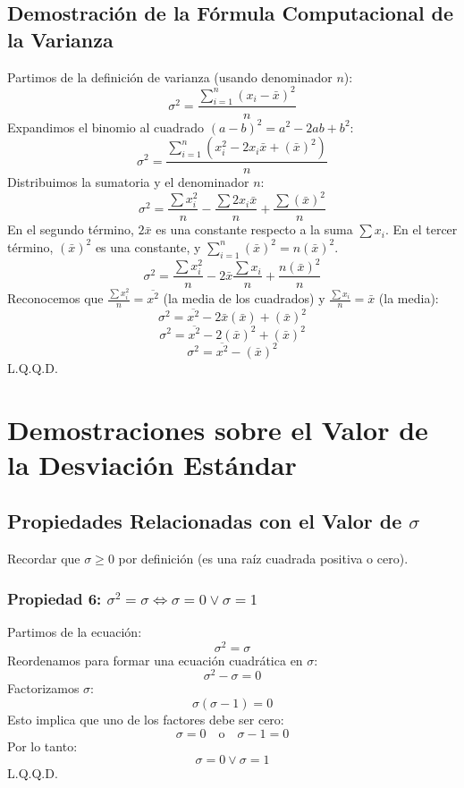 \documentclass[12pt, letterpaper]{article}
\begin{document}
\subsection{Demostración de la Fórmula Computacional de la Varianza}
Partimos de la definición de varianza (usando denominador $n$):
\[\sigma^2=\frac{\sum_{i=1}^{n} (x_i-\bar{x})^2}{n}\]
Expandimos el binomio al cuadrado $(a-b)^2 = a^2 - 2ab + b^2$:
\[\sigma^2=\frac{\sum_{i=1}^{n} (x_i^2 - 2x_i\bar{x} + (\bar{x})^2)}{n}\]
Distribuimos la sumatoria y el denominador $n$:
\[\sigma^2=\frac{\sum x_i^2}{n} - \frac{\sum 2x_i\bar{x}}{n} + \frac{\sum (\bar{x})^2}{n}\]
En el segundo término, $2\bar{x}$ es una constante respecto a la suma $\sum x_i$. En el tercer término, $(\bar{x})^2$ es una constante, y $\sum_{i=1}^{n} (\bar{x})^2 = n(\bar{x})^2$.
\[\sigma^2=\frac{\sum x_i^2}{n} - 2\bar{x} \frac{\sum x_i}{n} + \frac{n(\bar{x})^2}{n}\]
Reconocemos que $\frac{\sum x_i^2}{n} = \overline{x^2}$ (la media de los cuadrados) y $\frac{\sum x_i}{n} = \bar{x}$ (la media):
\[\sigma^2=\overline{x^2} - 2\bar{x} (\bar{x}) + (\bar{x})^2\]
\[\sigma^2=\overline{x^2} - 2(\bar{x})^2 + (\bar{x})^2\]
\[\sigma^2=\overline{x^2} - (\bar{x})^2\]
L.Q.Q.D.
\newpage

\section{Demostraciones sobre el Valor de la Desviación Estándar}
\subsection{\texorpdfstring{Propiedades Relacionadas con el Valor de $\sigma$}{Propiedades Relacionadas con el Valor de sigma}}
Recordar que $\sigma \ge 0$ por definición (es una raíz cuadrada positiva o cero).

\subsubsection{Propiedad 6: \texorpdfstring{$\sigma^2 = \sigma \iff \sigma=0 \vee \sigma=1$}{sigma-cuadrado = sigma <=> sigma=0 v sigma=1}}
Partimos de la ecuación:
\[\sigma^2=\sigma \]
Reordenamos para formar una ecuación cuadrática en $\sigma$:
\[\sigma^2-\sigma=0 \]
Factorizamos $\sigma$:
\[\sigma(\sigma-1)=0 \]
Esto implica que uno de los factores debe ser cero:
\[\sigma=0 \quad \text{o} \quad \sigma-1=0 \]
Por lo tanto:
\[\sigma=0 \vee \sigma=1 \]
L.Q.Q.D.
\end{document}
